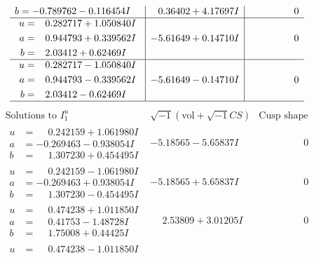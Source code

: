 \documentclass[1p]{elsarticle_modified}
\theoremstyle{definition}
\newcommand{\I}{\sqrt{-1}}
\begin{document}
$$\begin{array}{c|c|c}
\begin{aligned}
b &= -0.789762 - 0.116454 I\end{aligned}
 & \phantom{-}0.36402 + 4.17697 I & \phantom{-0.000000 } 0 \\ \hline\begin{aligned}
u &= \phantom{-}0.282717 + 1.050840 I \\
a &= \phantom{-}0.944793 + 0.339562 I \\
b &= \phantom{-}2.03412 + 0.62469 I\end{aligned}
 & -5.61649 + 0.14710 I & \phantom{-0.000000 } 0 \\ \hline\begin{aligned}
u &= \phantom{-}0.282717 - 1.050840 I \\
a &= \phantom{-}0.944793 - 0.339562 I \\
b &= \phantom{-}2.03412 - 0.62469 I\end{aligned}
 & -5.61649 - 0.14710 I & \phantom{-0.000000 } 0\\
 \hline 
 \end{array}$$\newpage$$\begin{array}{c|c|c}  
\text{Solutions to }I^u_{1}& \I (\text{vol} + \sqrt{-1}CS) & \text{Cusp shape}\\
 \hline 
\begin{aligned}
u &= \phantom{-}0.242159 + 1.061980 I \\
a &= -0.269463 - 0.938054 I \\
b &= \phantom{-}1.307230 + 0.454495 I\end{aligned}
 & -5.18565 - 5.65837 I & \phantom{-0.000000 } 0 \\ \hline\begin{aligned}
u &= \phantom{-}0.242159 - 1.061980 I \\
a &= -0.269463 + 0.938054 I \\
b &= \phantom{-}1.307230 - 0.454495 I\end{aligned}
 & -5.18565 + 5.65837 I & \phantom{-0.000000 } 0 \\ \hline\begin{aligned}
u &= \phantom{-}0.474238 + 1.011850 I \\
a &= \phantom{-}0.41753 - 1.48728 I \\
b &= \phantom{-}1.75008 + 0.44425 I\end{aligned}
 & \phantom{-}2.53809 + 3.01205 I & \phantom{-0.000000 } 0 \\ \hline\begin{aligned}
u &= \phantom{-}0.474238 - 1.011850 I \\

\end{aligned}
\end{array}$$
\end{document}
